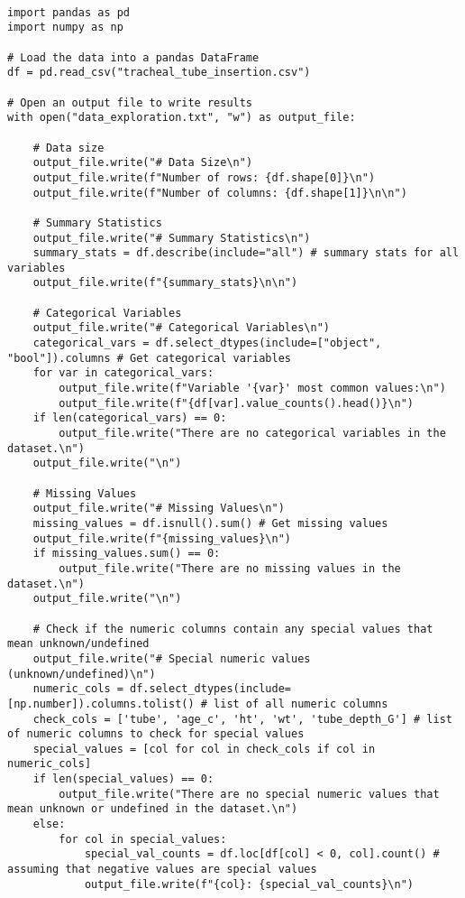 \documentclass[11pt]{article}
\begin{document}
\begin{verbatim}

import pandas as pd
import numpy as np

# Load the data into a pandas DataFrame
df = pd.read_csv("tracheal_tube_insertion.csv")

# Open an output file to write results
with open("data_exploration.txt", "w") as output_file:

    # Data size
    output_file.write("# Data Size\n")
    output_file.write(f"Number of rows: {df.shape[0]}\n")
    output_file.write(f"Number of columns: {df.shape[1]}\n\n")
    
    # Summary Statistics
    output_file.write("# Summary Statistics\n")
    summary_stats = df.describe(include="all") # summary stats for all variables
    output_file.write(f"{summary_stats}\n\n")
    
    # Categorical Variables
    output_file.write("# Categorical Variables\n")
    categorical_vars = df.select_dtypes(include=["object", "bool"]).columns # Get categorical variables
    for var in categorical_vars:
        output_file.write(f"Variable '{var}' most common values:\n")
        output_file.write(f"{df[var].value_counts().head()}\n")
    if len(categorical_vars) == 0:
        output_file.write("There are no categorical variables in the dataset.\n")
    output_file.write("\n")

    # Missing Values
    output_file.write("# Missing Values\n")
    missing_values = df.isnull().sum() # Get missing values
    output_file.write(f"{missing_values}\n")
    if missing_values.sum() == 0:
        output_file.write("There are no missing values in the dataset.\n")
    output_file.write("\n")

    # Check if the numeric columns contain any special values that mean unknown/undefined
    output_file.write("# Special numeric values (unknown/undefined)\n")
    numeric_cols = df.select_dtypes(include=[np.number]).columns.tolist() # list of all numeric columns
    check_cols = ['tube', 'age_c', 'ht', 'wt', 'tube_depth_G'] # list of numeric columns to check for special values
    special_values = [col for col in check_cols if col in numeric_cols]
    if len(special_values) == 0:
        output_file.write("There are no special numeric values that mean unknown or undefined in the dataset.\n")
    else: 
        for col in special_values:
            special_val_counts = df.loc[df[col] < 0, col].count() # assuming that negative values are special values
            output_file.write(f"{col}: {special_val_counts}\n")


\end{verbatim}
\end{document}
